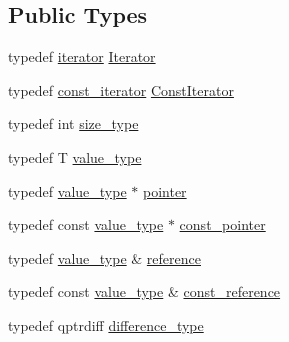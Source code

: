 \subsection*{Public Types}
\begin{DoxyCompactItemize}
\item 
typedef \hyperlink{class_q_list_1_1iterator}{iterator} \hyperlink{class_q_list_acfbe3160851f25b0daeec4c7b0439f35}{Iterator}
\item 
typedef \hyperlink{class_q_list_1_1const__iterator}{const\+\_\+iterator} \hyperlink{class_q_list_a2bac7028ad973eb7ff10b2bb1fc58305}{Const\+Iterator}
\item 
typedef int \hyperlink{class_q_list_a5b78b75651f6641fe9339b050508aa6f}{size\+\_\+type}
\item 
typedef T \hyperlink{class_q_list_a5c685421300b8a855730c9b06ff43605}{value\+\_\+type}
\item 
typedef \hyperlink{class_q_list_a5c685421300b8a855730c9b06ff43605}{value\+\_\+type} $\ast$ \hyperlink{class_q_list_ad81e368aee3084fe5ddc056fa649a4ac}{pointer}
\item 
typedef const \hyperlink{class_q_list_a5c685421300b8a855730c9b06ff43605}{value\+\_\+type} $\ast$ \hyperlink{class_q_list_ac2d1086a1098740e3ee2ed66e4f63f7b}{const\+\_\+pointer}
\item 
typedef \hyperlink{class_q_list_a5c685421300b8a855730c9b06ff43605}{value\+\_\+type} \& \hyperlink{class_q_list_adc9961317867d5844c90efac09c09bfb}{reference}
\item 
typedef const \hyperlink{class_q_list_a5c685421300b8a855730c9b06ff43605}{value\+\_\+type} \& \hyperlink{class_q_list_ae8717226a5e2af5b53d3e22d4b1654aa}{const\+\_\+reference}
\item 
typedef qptrdiff \hyperlink{class_q_list_a253a81bf62c0d83e0f5e8abc61ac87f9}{difference\+\_\+type}
\end{DoxyCompactItemize}
